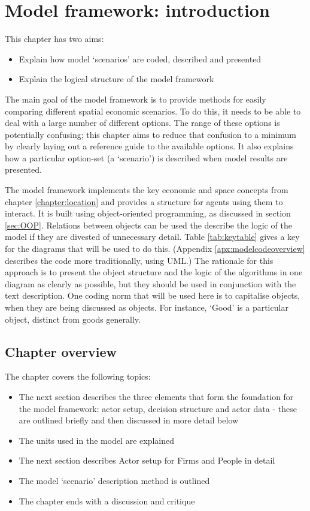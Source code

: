 \section{Model framework: introduction \label{sec:frameworkintro}}

This chapter has two aims:

\begin{itemize}
	\item Explain how model `scenarios' are coded, described and presented
	\item Explain the logical structure of the model framework
\end{itemize}

The main goal of the model framework is to provide methods for easily comparing different spatial economic scenarios. To do this, it needs to be able to deal with a large number of different options. The range of these options is potentially confusing; this chapter aims to reduce that confusion to a minimum by clearly laying out a reference guide to the available options. It also explains how a particular option-set (a `scenario') is described when model results are presented.

The model framework implements the key economic and space concepts from chapter \ref{chapter:location} and provides a structure for agents using them to interact. It is built using object-oriented programming, as discussed in section \ref{sec:OOP}. Relations between objects can be used the describe the logic of the model if they are divested of unnecessary detail. Table \ref{tab:keytable} gives a key for the diagrams that will be used to do this. (Appendix \ref{apx:modelcodeoverview} describes the code more traditionally, using UML.) The rationale for this approach is to present the object structure and the logic of the algorithms in one diagram as clearly as possible, but they should be used in conjunction with the text description. One coding norm that will be used here is to capitalise objects, when they are being discussed as objects. For instance, `Good' is a particular object, distinct from goods generally. 

\subsection{Chapter overview}

The chapter covers the following topics:

\begin{itemize}
	\item The next section describes the three elements that form the foundation for the model framework: actor setup, decision structure and actor data - these are outlined briefly and then discussed in more detail below
	\item The units used in the model are explained
	\item The next section describes Actor setup for Firms and People in detail
	\item The model `scenario' description method is outlined
	\item The chapter ends with a discussion and critique
\end{itemize}

